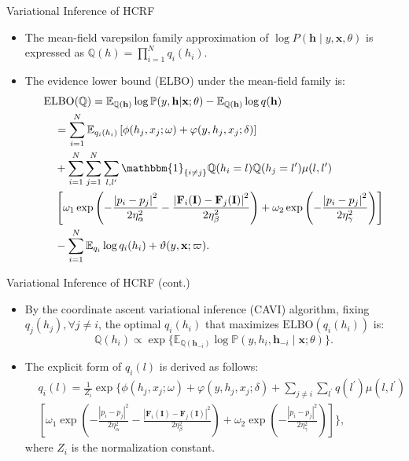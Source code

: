 \documentclass[leqno]{beamer}
\newcommand{\EE}{{\mathbb{E}}}
\newcommand{\PP}{{\mathbb{P}}}
\newcommand{\QQ}{{\mathbb{Q}}}
\newcommand{\Fb}{\mathbf{F}}
\newcommand{\Ib}{\mathbf{I}}
\newcommand{\hb}{\mathbf{h}}
\newcommand{\xb}{\mathbf{x}}
\newcommand{\one}{\mathbbm{1}}
\begin{document}
\begin{frame}{Variational Inference of HCRF}
\begin{small}
\begin{itemize}
\item The mean-field varepsilon family approximation of
$\log P(\hb \mid y,\xb,\theta)$ is expressed as
$\QQ(h) = \prod_{i=1}^N q_i(h_i)$.
\item The evidence lower bound (ELBO) under the mean-field family is:
\begin{equation*}
\begin{split}
& \mathrm{ELBO}(\QQ) = \EE_{\QQ(\hb)} \log\PP(y, \hb \vert \xb; \theta)
- \EE_{\QQ(\hb)} \log q(\hb) \\
&\quad = \sum_{i=1}^N \EE_{q_i(h_i)}
\left[ \phi(h_j, x_j; \omega) + \varphi(y, h_j, x_j; \delta) \right] \\
&\quad + \sum_{i=1}^N \sum_{j=1}^N \sum_{l,l^\prime} \one_{\{i \neq j\}} 
\QQ(h_i = l) \QQ(h_j = l^\prime) \mu(l, l^\prime) \\
&\quad \left[ \omega_1 \exp \left(
- \frac{\left\lvert p_i - p_j \right\rvert^2}{2\eta_\alpha^2}
- \frac{\left\lvert \Fb_i(\Ib) - \Fb_j(\Ib) \right\rvert^2}{2\eta_\beta^2}
\right) + \omega_2 \exp \left(
- \frac{\left\lvert p_i - p_j \right\rvert^2}{2\eta_\gamma^2}
\right) \right] \\
&\quad - \sum_{i=1}^N \EE_{q_i} \log q_i(h_i) + \vartheta(y, \xb; 
\varpi).
\end{split}
\end{equation*}
\end{itemize}
\end{small}
\end{frame}


\begin{frame}{Variational Inference of HCRF (cont.)}
\begin{itemize}
\item By the coordinate ascent variational inference (CAVI) algorithm, fixing
$q_j(h_j), \forall j \neq i$, the optimal $q_i(h_i)$ that maximizes
$\mathrm{ELBO}(q_i(h_i))$ is:
\begin{equation*}
\QQ(h_i) \propto \exp\{\EE_{\QQ(\hb_{-i})}
\log\PP(y, h_i, \hb_{-i} \mid \xb; \theta)\}.
\end{equation*}
\item The explicit form of $q_i(l)$ is derived as follows:
\begin{equation*}
\begin{split}
& q_i(l) = \frac{1}{Z_i} \exp \Bigg\{
\phi(h_j, x_j; \omega) + \varphi(y, h_j, x_j; \delta)
+ \sum_{j \neq i} \sum_{l^\prime} q(l^\prime) \mu(l, l^\prime) \\
& \left[ \omega_1 \exp \left(
- \frac{\left\lvert p_i - p_j \right\rvert^2}{2\eta_\alpha^2}
- \frac{\left\lvert \Fb_i(\Ib) - \Fb_j(\Ib) \right\rvert^2}{2\eta_\beta^2}
\right)
+ \omega_2 \exp \left(
- \frac{\left\lvert p_i - p_j 
\right\rvert^2}{2\eta_\gamma^2}
\right)
\right]
\Bigg\},
\end{split}
\end{equation*}
where $Z_i$ is the normalization constant.
\end{itemize}
\end{frame}
\end{document}
